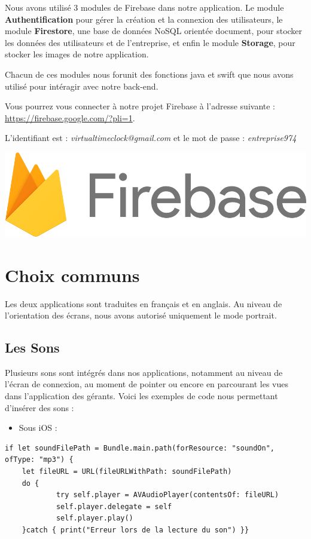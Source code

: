 \documentclass{article}
\begin{document}
Nous avons utilisé 3 modules de Firebase \cite{Firebase} dans notre application. 
Le module \textbf{Authentification} pour gérer la création et la connexion des utilisateurs, le module \textbf{Firestore}, une base de données NoSQL orientée document, pour stocker les données des utilisateurs et de l'entreprise, et enfin le module \textbf{Storage}, pour stocker les images de notre application.

Chacun de ces modules nous forunit des fonctions java et swift que nous avons utilisé pour intéragir avec notre back-end.

Vous pourrez vous connecter à notre projet Firebase à l'adresse suivante : \url{https://firebase.google.com/?pli=1}. 

L'identifiant est : \textit{virtualtimeclock@gmail.com} et le mot de passe : \textit{entreprise974}

\begin{center}
  \includegraphics[scale=0.2]{logo_firebase.png}
\end{center}

\newpage

\section{Choix communs}
Les deux applications sont traduites en français et en anglais. Au niveau de l'orientation des écrans, nous avons autorisé uniquement le mode portrait. 

\subsection{Les Sons}
Plusieurs sons sont intégrés dans nos applications, notamment au niveau de l'écran de connexion, au moment de pointer ou encore en parcourant les vues dans l'application des gérants. Voici les exemples de code nous permettant d'insérer des sons : 

\begin{itemize}
\item  Sous iOS : 
\end{itemize}
\begin{verbatim}
if let soundFilePath = Bundle.main.path(forResource: "soundOn", ofType: "mp3") {
    let fileURL = URL(fileURLWithPath: soundFilePath)
    do {
    		try self.player = AVAudioPlayer(contentsOf: fileURL)
            self.player.delegate = self
    		self.player.play()
    }catch { print("Erreur lors de la lecture du son") }}
\end{verbatim}
\end{document}

